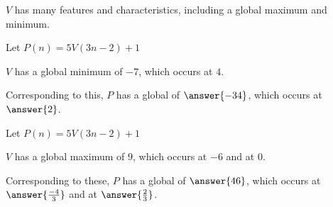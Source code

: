 \documentclass{ximera}
\begin{document}
\begin{exercise}
$V$ has many features and characteristics, including a global maximum and minimum.  






\begin{question}



Let $P(n) = 5 V(3n - 2) + 1$


\item $V$ has a global minimum of $-7$, which occurs at $4$.  



Corresponding to this, $P$ has a global  of $\answer{-34}$, which occurs at $\answer{2}$.


\end{question}








\begin{question}



Let $P(n) = 5 V(3n - 2) + 1$


\item $V$ has a global maximum of $9$, which occurs at $-6$ and at $0$.  



Corresponding to these, $P$ has a global  of $\answer{46}$, which occurs at $\answer{\frac{-4}{3}}$ and at $\answer{\frac{2}{3}}$.


\end{question}






\end{exercise}
\end{document}
